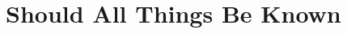 \hypertarget{should-all-things-be-known}{%
\section*{Should All Things Be Known}\label{should-all-things-be-known}}
